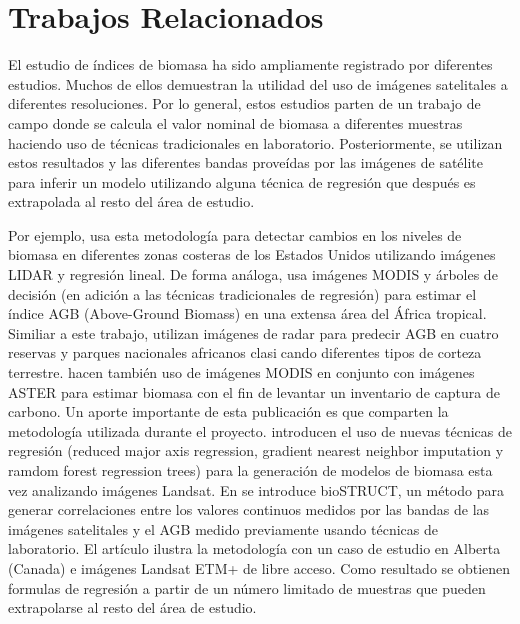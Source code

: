 \section{Trabajos Relacionados}

El estudio de índices de biomasa ha sido ampliamente registrado por diferentes estudios. Muchos de ellos demuestran la utilidad del uso de imágenes
satelitales a diferentes resoluciones. Por lo general, estos estudios parten de un 
trabajo de campo donde se calcula el valor nominal de biomasa a diferentes
muestras haciendo uso de técnicas tradicionales en laboratorio. Posteriormente,
se utilizan estos resultados y las diferentes bandas proveídas por las imágenes
de satélite para inferir un modelo utilizando alguna técnica de regresión que
después es extrapolada al resto del área de estudio.

Por ejemplo, \cite{klemas2013remotesensing} usa esta metodología para detectar cambios en
los niveles de biomasa en diferentes zonas costeras de los Estados Unidos utilizando
imágenes LIDAR y regresión lineal. De forma análoga, \cite{baccini2008afirst}
usa imágenes MODIS y árboles de decisión (en adición a las técnicas
tradicionales de regresión) para estimar el índice AGB (Above-Ground Biomass)
en una extensa área del África tropical. Similiar a este trabajo, \cite{mitchard2009usingsatellite}
utilizan imágenes de radar para predecir AGB en cuatro reservas y parques
nacionales africanos clasicando diferentes tipos de corteza terrestre.
\cite{muukkonen2007biomass} hacen también uso de imágenes MODIS en
conjunto con imágenes ASTER para estimar biomasa con el fin de levantar un
inventario de captura de carbono. Un aporte importante de esta publicación es
que comparten la metodología utilizada durante el proyecto. \cite{powell2010quantification}
introducen el uso de nuevas técnicas de regresión (reduced major axis regression,
gradient nearest neighbor imputation y ramdom forest regression trees) para la
generación de modelos de biomasa esta vez analizando imágenes Landsat.
En \cite{hall2006modeling} se introduce bioSTRUCT, un método para generar
correlaciones entre los valores continuos medidos por las bandas de las imágenes
satelitales y el AGB medido previamente usando técnicas de laboratorio. El
artículo ilustra la metodología con un caso de estudio en Alberta (Canada) e
imágenes Landsat ETM+ de libre acceso. Como resultado se obtienen formulas
de regresión a partir de un número limitado de muestras que pueden extrapolarse
al resto del área de estudio.

